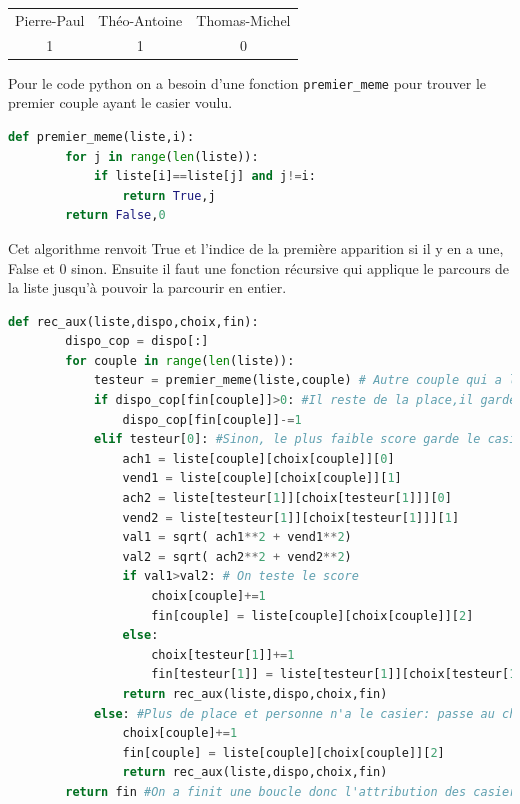 \documentclass[11pt]{article}
\begin{document}
\begin{center}
\begin{tabular}{ c| c| c }
   Pierre-Paul & Théo-Antoine & Thomas-Michel \\
   1 & 1 & 0 \\
 \end{tabular}
\end{center}

Pour le code python on a besoin d'une fonction \texttt{premier\_meme} pour trouver le premier couple ayant le casier voulu.

\begin{lstlisting}[language=python, caption={Fonction python \texttt{premier\_meme}}]
def premier_meme(liste,i):
        for j in range(len(liste)):
            if liste[i]==liste[j] and j!=i:
                return True,j
        return False,0
\end{lstlisting}

Cet algorithme renvoit True et l'indice de la première apparition si il y en a une, False et 0 sinon.
Ensuite il faut une fonction récursive qui applique le parcours de la liste jusqu'à pouvoir la parcourir en entier.

\begin{lstlisting}[language=python, caption={Implémentation de l'algorithme récursif}]
   def rec_aux(liste,dispo,choix,fin):
        dispo_cop = dispo[:]
        for couple in range(len(liste)):
            testeur = premier_meme(liste,couple) # Autre couple qui a le meme casier
            if dispo_cop[fin[couple]]>0: #Il reste de la place,il garde ce casier
                dispo_cop[fin[couple]]-=1
            elif testeur[0]: #Sinon, le plus faible score garde le casier
                ach1 = liste[couple][choix[couple]][0]
                vend1 = liste[couple][choix[couple]][1]
                ach2 = liste[testeur[1]][choix[testeur[1]]][0]
                vend2 = liste[testeur[1]][choix[testeur[1]]][1]
                val1 = sqrt( ach1**2 + vend1**2)
                val2 = sqrt( ach2**2 + vend2**2)
                if val1>val2: # On teste le score
                    choix[couple]+=1
                    fin[couple] = liste[couple][choix[couple]][2]
                else: 
                    choix[testeur[1]]+=1
                    fin[testeur[1]] = liste[testeur[1]][choix[testeur[1]]][2]
                return rec_aux(liste,dispo,choix,fin) 
            else: #Plus de place et personne n'a le casier: passe au choix suivant
                choix[couple]+=1
                fin[couple] = liste[couple][choix[couple]][2]
                return rec_aux(liste,dispo,choix,fin)
        return fin #On a finit une boucle donc l'attribution des casiers est valide 
\end{lstlisting}
\end{document}
